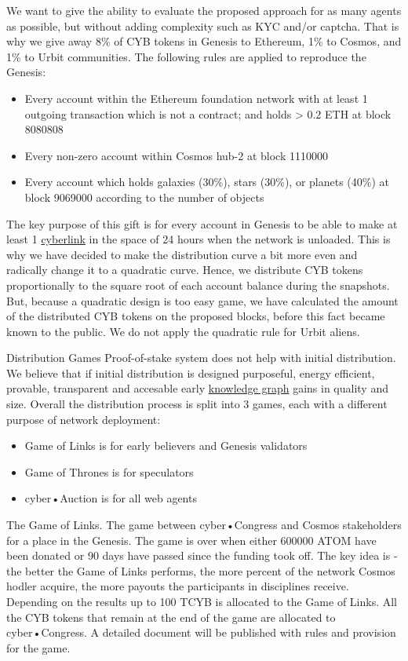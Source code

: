 \documentclass[8pt,oneside]{amsart}
\makeatletter
\renewcommand\subsection{\@startsection{subsection}
                                    {2}{\z@}
                                    {-3.25ex\@plus -1ex \@minus -.2ex}
                                    {0ex \@plus .2ex}
                                    {\play\Large}
                        }
\newcommand{\titleSection}[1]{\subsection{#1}}
\makeatother
\begin{document}
We want to give the ability to evaluate the proposed approach for as many agents as possible, but without adding complexity such as KYC and/or captcha. That is why we give away 8\% of CYB tokens in Genesis to Ethereum, 1\% to Cosmos, and 1\% to Urbit communities. The following rules are applied to reproduce the Genesis:
\begin{itemize}
 \item Every account within the Ethereum foundation network with at least 1 outgoing transaction which is not a contract; and holds > 0.2 ETH at block 8080808
 \item Every non-zero account within Cosmos hub-2 at block 1110000
 \item Every account which holds galaxies (30\%), stars (30\%), or planets (40\%) at block 9069000 according to the number of objects
\end{itemize}

The key purpose of this gift is for every account in Genesis to be able to make at least 1 {\hyperref[cyberlinks]{cyberlink}} in the space of 24 hours when the network is unloaded. This is why we have decided to make the distribution curve a bit more even and radically change it to a quadratic curve. Hence, we distribute CYB tokens proportionally to the square root of each account balance during the snapshots. But, because a quadratic design is too easy game, we have calculated the amount of the distributed CYB tokens on the proposed blocks, before this fact became known to the public. We do not apply the quadratic rule for Urbit aliens.

\titleSection{Distribution Games}\label{distribution-games}
Proof-of-stake system does not help with initial distribution. We believe that if initial distribution is designed purposeful, energy efficient, provable, transparent and accesable early {\hyperref[knowledge-graph]{knowledge graph}} gains in quality and size. Overall the distribution process is split into 3 games, each with a different purpose of network deployment:

\begin{itemize}
\item Game of Links is for early believers and Genesis validators
\item Game of Thrones is for speculators
\item cyber•Auction is for all web agents
\end{itemize}

The Game of Links. The game between cyber•Congress and Cosmos stakeholders for a place in the Genesis. The game is over when either 600000 ATOM have been donated or 90 days have passed since the funding took off. The key idea is - the better the Game of Links performs, the more percent of the network Cosmos hodler acquire, the more payouts the participants in disciplines receive. Depending on the results up to 100 TCYB is allocated to the Game of Links. All the CYB tokens that remain at the end of the game are allocated to cyber•Congress. A detailed document will be published with rules and provision for the game.
\end{document}
